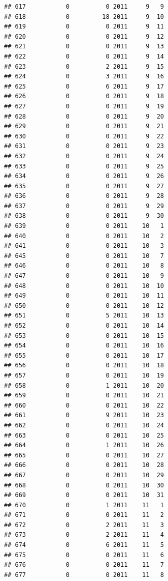 \documentclass[
]{article}
\begin{document}
\begin{verbatim}
## 617           0          0 2011     9   9
## 618           0         18 2011     9  10
## 619           0          0 2011     9  11
## 620           0          0 2011     9  12
## 621           0          0 2011     9  13
## 622           0          0 2011     9  14
## 623           0          2 2011     9  15
## 624           0          3 2011     9  16
## 625           0          6 2011     9  17
## 626           0          0 2011     9  18
## 627           0          0 2011     9  19
## 628           0          0 2011     9  20
## 629           0          0 2011     9  21
## 630           0          0 2011     9  22
## 631           0          0 2011     9  23
## 632           0          0 2011     9  24
## 633           0          0 2011     9  25
## 634           0          0 2011     9  26
## 635           0          0 2011     9  27
## 636           0          0 2011     9  28
## 637           0          0 2011     9  29
## 638           0          0 2011     9  30
## 639           0          0 2011    10   1
## 640           0          0 2011    10   2
## 641           0          0 2011    10   3
## 645           0          0 2011    10   7
## 646           0          0 2011    10   8
## 647           0          0 2011    10   9
## 648           0          0 2011    10  10
## 649           0          0 2011    10  11
## 650           0          0 2011    10  12
## 651           0          5 2011    10  13
## 652           0          0 2011    10  14
## 653           0          0 2011    10  15
## 654           0          0 2011    10  16
## 655           0          0 2011    10  17
## 656           0          0 2011    10  18
## 657           0          0 2011    10  19
## 658           0          1 2011    10  20
## 659           0          0 2011    10  21
## 660           0          0 2011    10  22
## 661           0          9 2011    10  23
## 662           0          0 2011    10  24
## 663           0          0 2011    10  25
## 664           0          1 2011    10  26
## 665           0          0 2011    10  27
## 666           0          0 2011    10  28
## 667           0          0 2011    10  29
## 668           0          0 2011    10  30
## 669           0          0 2011    10  31
## 670           0          1 2011    11   1
## 671           0          0 2011    11   2
## 672           0          2 2011    11   3
## 673           0          2 2011    11   4
## 674           0          6 2011    11   5
## 675           0          0 2011    11   6
## 676           0          0 2011    11   7
## 677           0          0 2011    11   8

\end{verbatim}
\end{document}
